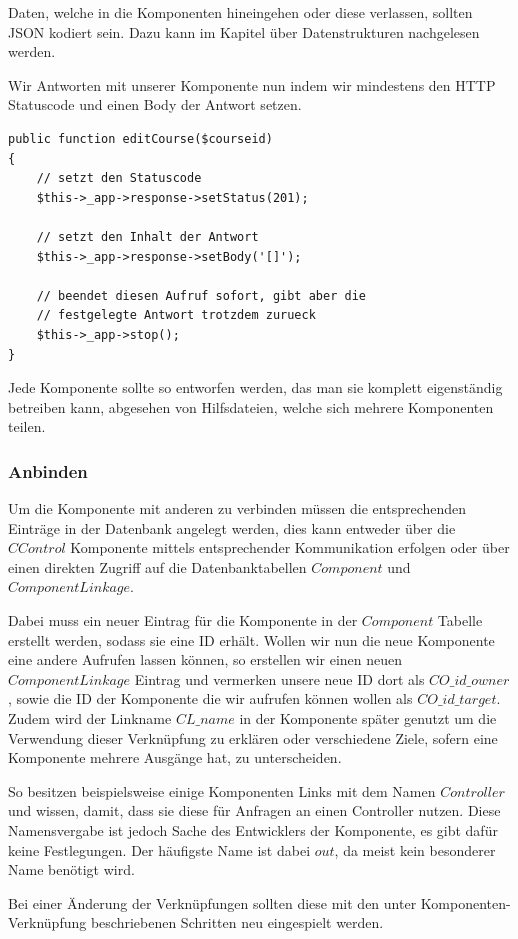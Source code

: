Daten, welche in die Komponenten hineingehen oder diese verlassen, sollten JSON kodiert sein. Dazu kann im Kapitel über Datenstrukturen nachgelesen werden.

Wir Antworten mit unserer Komponente nun indem wir mindestens den HTTP Statuscode und einen Body der Antwort setzen.

\begin{minipage}{\textwidth}
\begin{lstlisting}
public function editCourse($courseid)
{
    // setzt den Statuscode
    $this->_app->response->setStatus(201);

    // setzt den Inhalt der Antwort
    $this->_app->response->setBody('[]');
    
    // beendet diesen Aufruf sofort, gibt aber die 
    // festgelegte Antwort trotzdem zurueck
    $this->_app->stop();
}
\end{lstlisting}
\end{minipage}

Jede Komponente sollte so entworfen werden, das man sie komplett eigenständig betreiben kann, abgesehen von Hilfsdateien, welche sich mehrere Komponenten teilen.


 
 \subsubsection{Anbinden}
 Um die Komponente mit anderen zu verbinden müssen die entsprechenden Einträge in der Datenbank angelegt werden, dies kann entweder über die $CControl$ Komponente mittels entsprechender Kommunikation erfolgen oder über einen direkten Zugriff auf die Datenbanktabellen $Component$ und $ComponentLinkage$. 
 
Dabei muss ein neuer Eintrag für die Komponente in der $Component$ Tabelle erstellt werden, sodass sie eine ID erhält. Wollen wir nun die neue Komponente eine andere Aufrufen lassen können, so erstellen wir einen neuen $ComponentLinkage$ Eintrag und vermerken unsere neue ID dort als $CO\_id\_owner$, sowie die ID der Komponente die wir aufrufen können wollen als $CO\_id\_target$. Zudem wird der Linkname $CL\_name$ in der Komponente später genutzt um die Verwendung dieser Verknüpfung zu erklären oder verschiedene Ziele, sofern eine Komponente mehrere Ausgänge hat, zu unterscheiden.

So besitzen beispielsweise einige Komponenten Links mit dem Namen $Controller$ und wissen, damit, dass sie diese für Anfragen an einen Controller nutzen. Diese Namensvergabe ist jedoch Sache des Entwicklers der Komponente, es gibt dafür keine Festlegungen. Der häufigste Name ist dabei $out$, da meist kein besonderer Name benötigt wird.
 
Bei einer Änderung der Verknüpfungen sollten diese mit den unter Komponenten-Verknüpfung beschriebenen Schritten neu eingespielt werden.